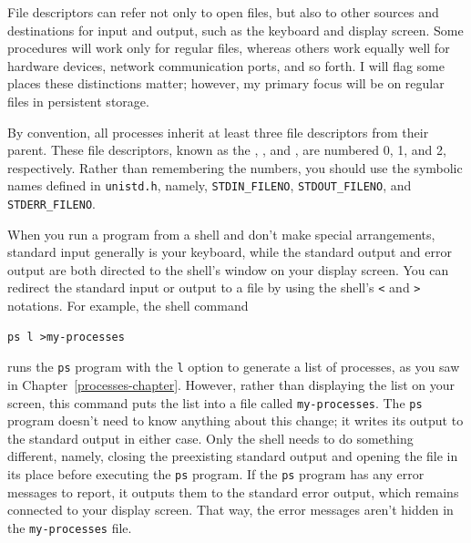 File descriptors can refer not only to open files, but also to other
sources and destinations for input and output, such as the keyboard
and display screen.  Some procedures will work only for regular files,
whereas others work equally well for hardware devices, network
communication ports, and so forth.  I will flag some places these distinctions
matter; however, my primary focus will be on regular files in persistent storage.

By convention, all processes inherit at least three file descriptors
from their parent.
These file descriptors, known as the ,
, and ,
are numbered 0, 1, and 2, respectively.  Rather than
remembering the numbers, you should use the symbolic names defined in
\verb|unistd.h|, namely, \verb|STDIN_FILENO|, \verb|STDOUT_FILENO|, and
\verb|STDERR_FILENO|.

When you run a program from a shell and don't make special
arrangements, standard input generally is your keyboard, while the
standard output and error output are both directed to the shell's
window on your display screen.  You can redirect the standard input or
output to a file by using the shell's \verb|<| and \verb|>|
notations.  For example, the shell command
\begin{verbatim}
ps l >my-processes
\end{verbatim}
runs the \verb|ps| program with the \verb|l| option to generate a
list of processes, as you saw in Chapter~\ref{processes-chapter}.  However, rather
than displaying the list on your screen, this command puts the list
into a file called \verb|my-processes|.  The \verb|ps| program doesn't
need to know anything about this change; it  writes its output
to the standard output in either case.  Only the shell needs to do
something different, namely, closing the preexisting standard output
and opening the file in its place before executing the
\verb|ps| program.
If the \verb|ps| program has any error messages to
report, it outputs them to the standard error output, which remains
connected to your display screen.  That way, the error messages aren't
hidden in the \verb|my-processes| file.

